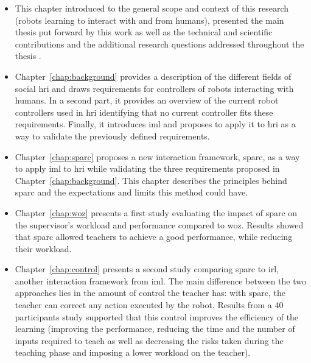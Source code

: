 \begin{itemize}
	\item This chapter introduced to the general scope and context of this research (robots learning to interact with and from humans), presented the main thesis put forward by this work as well as the technical and scientific contributions and the additional research questions addressed throughout the thesis .

	\item Chapter~\ref{chap:background} provides a description of the different fields of social \gls{hri} and draws requirements for controllers of robots interacting with humans. In a second part, it provides an overview of the current robot controllers used in \gls{hri} identifying that no current controller fits these requirements. Finally, it introduces \gls{iml} and proposes to apply it to \gls{hri} as a way to validate the previously defined requirements.
	
	\item Chapter~\ref{chap:sparc} proposes a new interaction framework, \gls{sparc}, as a way to apply \gls{iml} to \gls{hri} while validating the three requirements proposed in Chapter~\ref{chap:background}. This chapter describes the principles behind \gls{sparc} and the expectations and limits this method could have.
	
	\item Chapter~\ref{chap:woz} presents a first study evaluating the impact of \gls{sparc} on the supervisor's workload and performance compared to \gls{woz}. Results showed that \gls{sparc} allowed teachers to achieve a good performance, while reducing their workload.
	
	\item Chapter~\ref{chap:control} presents a second study comparing \gls{sparc} to \gls{irl}, another interaction framework from \gls{iml}. The main difference between the two approaches lies in the amount of control the teacher has: with \gls{sparc}, the teacher can correct any action executed by the robot. Results from a 40 participants study supported that this control improves the efficiency of the learning (improving the performance, reducing the time and the number of inputs required to teach as well as decreasing the risks taken during the teaching phase and imposing a lower workload on the teacher).
	

\end{itemize}
